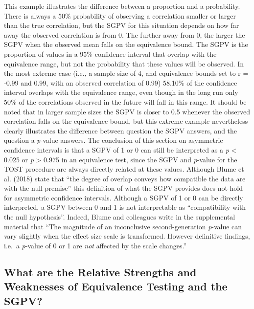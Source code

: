 \documentclass[floatsintext,man]{apa6}
\theoremstyle{definition}
\theoremstyle{definition}
\theoremstyle{definition}
\theoremstyle{remark}
\begin{document}
This example illustrates the difference between a proportion and a
probability. There is always a 50\% probability of observing a
correlation smaller or larger than the true correlation, but the SGPV
for this situation depends on how far away the observed correlation is
from 0. The further away from 0, the larger the SGPV when the observed
mean falls on the equivalence bound. The SGPV is the proportion of
values in a 95\% confidence interval that overlap with the equivalence
range, but not the probability that these values will be observed. In
the most extreme case (i.e., a sample size of 4, and equivalence bounds
set to r = -0.99 and 0.99, with an observed correlation of 0.99) 58.10\%
of the confidence interval overlaps with the equivalence range, even
though in the long run only 50\% of the correlations observed in the
future will fall in this range. It should be noted that in larger sample
sizes the SGPV is closer to 0.5 whenever the observed correlation falls
on the equivalence bound, but this extreme example nevertheless clearly
illustrates the difference between question the SGPV answers, and the
question a \emph{p}-value answers. The conclusion of this section on
asymmetric confidence intervals is that a SGPV of 1 or 0 can still be
interpreted as a \emph{p} \textless{} 0.025 or \emph{p} \textgreater{}
0.975 in an equivalence test, since the SGPV and \emph{p}-value for the
TOST procedure are always directly related at these values. Although
Blume et al. (2018) state that \enquote{the degree of overlap conveys
how compatible the data are with the null premise} this definition of
what the SGPV provides does not hold for asymmetric confidence
intervals. Although a SGPV of 1 or 0 can be directly interpreted, a SGPV
between 0 and 1 is not interpretable as \enquote{compatibility with the
null hypothesis}. Indeed, Blume and colleagues write in the supplemental
material that \enquote{The magnitude of an inconclusive
second-generation \emph{p}-value can vary slightly when the effect size
scale is transformed. However definitive findings, i.e.~a \emph{p}-value
of 0 or 1 are \emph{not} affected by the scale changes.}

\subsection{What are the Relative Strengths and Weaknesses of
Equivalence Testing and the
SGPV?}\label{what-are-the-relative-strengths-and-weaknesses-of-equivalence-testing-and-the-sgpv}
\end{document}
